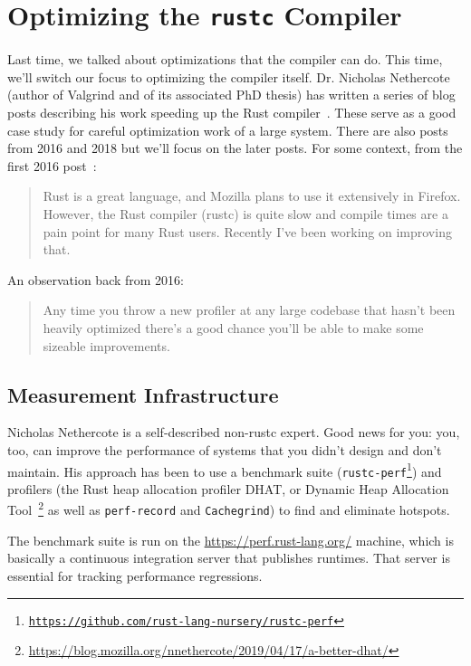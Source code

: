\documentclass[a4paper]{report}
\begin{document}
\section*{Optimizing the \texttt{rustc} Compiler}

Last time, we talked about optimizations that the compiler can do.
This time, we'll switch our focus to optimizing the compiler itself.
Dr. Nicholas Nethercote (author of Valgrind and of its associated PhD thesis)
has written a series of blog posts describing his
work speeding up the Rust
compiler~\cite{nethercote20:_how_rust,nethercote19:_how_rust,nethercote19:_rust,nethercote19b:_how_rust}. These
serve as a good case study for careful optimization work of a large
system. There are also posts from 2016 and 2018 but we'll focus on the later posts.
For some context, from the first 2016 post~\cite{nethercote16:_how_rust}:
\begin{quote}
Rust is a great language, and Mozilla plans to use it extensively in Firefox. However, the Rust compiler (rustc) is quite slow and compile times are a pain point for many Rust users. Recently I've been working on improving that.
\end{quote}

An observation back from 2016:
\begin{quote}
Any time you throw a new profiler at any large codebase that hasn't been heavily optimized there's a good chance you'll be able to make some sizeable improvements.
\end{quote}

\subsection*{Measurement Infrastructure}

Nicholas Nethercote is a self-described non-rustc expert. Good news for you: you, too, can improve the
performance of systems that you didn't design and don't maintain. His approach has been to use a benchmark suite (\texttt{rustc-perf\footnote{\url{https://github.com/rust-lang-nursery/rustc-perf}}})
and profilers (the Rust heap allocation profiler DHAT, or Dynamic Heap Allocation Tool~\footnote{\url{https://blog.mozilla.org/nnethercote/2019/04/17/a-better-dhat/}} as well as
\texttt{perf-record} and \texttt{Cachegrind}) to find and eliminate hotspots.

The benchmark suite is run on the \url{https://perf.rust-lang.org/} machine, which is basically
a continuous integration server that publishes runtimes. That server is essential for tracking performance regressions.
\end{document}

